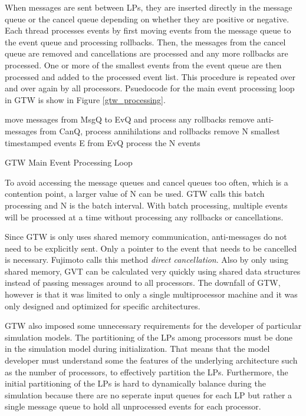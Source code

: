 \documentclass[11pt]{book}
\begin{document}
\noindent
When messages are sent between LPs, they are inserted directly in the message queue or the
cancel queue depending on whether they are positive or negative.  Each thread processes
events by first moving events from the message queue to the event queue and processing
rollbacks.  Then, the messages from the cancel queue are removed and cancellations are
processed and any more rollbacks are processed.  One or more of the smallest events from
the event queue are then processed and added to the processed event list.  This procedure
is repeated over and over again by all processors.  Psuedocode for the main event
processing loop in GTW is show in Figure \ref{gtw_processing}.

\begin{algorithm}
\DontPrintSemicolon
     {
        move messages from MsgQ to EvQ and process any rollbacks\;
        remove anti-messages from CanQ, process annihilations and rollbacks\;
        remove N smallest timestamped events E from EvQ\;
        process the N events\;
    }
\caption{GTW Main Event Processing Loop\cite{das-94,fujimoto-94}\label{gtw_processing}}
\end{algorithm}

\noindent
To avoid accessing the message queues and cancel queues too often, which is a contention
point, a larger value of N can be used.  GTW calls this batch processing and N is the
batch interval.  With batch processing, multiple events will be processed at a time
without processing any rollbacks or cancellations.

Since GTW is only uses shared memory communication, anti-messages do not need to be
explicitly sent.  Only a pointer to the event that needs to be cancelled is necessary.
Fujimoto calls this method \emph{direct cancellation}.  Also by only using shared memory,
GVT can be calculated very quickly using shared data structures instead of passing
messages around to all processors.  The downfall of GTW, however is that it was limited to
only a single multiprocessor machine and it was only designed and optimized for specific
architectures.

GTW also imposed some unnecessary requirements for the developer of particular simulation
models.  The partitioning of the LPs among processors must be done in the simulation model
during initialization.  That means that the model developer must understand some the
features of the underlying architecture such as the number of processors, to effectively
partition the LPs.  Furthermore, the initial partitioning of the LPs is hard to
dynamically balance during the simulation because there are no seperate input queues for
each LP but rather a single message queue to hold all unprocessed events for each
processor.
\end{document}
